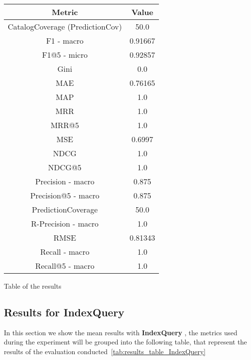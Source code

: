 \documentclass[11pt]{article}
\begin{document}
\begin{center}
    \begin{tabular}{|c|c|}
        \hline
        \textbf{Metric} & \textbf{Value} \\ \hline
                CatalogCoverage (PredictionCov) & 50.0 \\ \hline
                F1 - macro & 0.91667 \\ \hline
                F1@5 - micro & 0.92857 \\ \hline
                Gini & 0.0 \\ \hline
                MAE & 0.76165 \\ \hline
                MAP & 1.0 \\ \hline
                MRR & 1.0 \\ \hline
                MRR@5 & 1.0 \\ \hline
                MSE & 0.6997 \\ \hline
                NDCG & 1.0 \\ \hline
                NDCG@5 & 1.0 \\ \hline
                Precision - macro & 0.875 \\ \hline
                Precision@5 - macro & 0.875 \\ \hline
                PredictionCoverage & 50.0 \\ \hline
                R-Precision - macro & 1.0 \\ \hline
                RMSE & 0.81343 \\ \hline
                Recall - macro & 1.0 \\ \hline
                Recall@5 - macro & 1.0 \\ \hline
             \end{tabular}
    \captionsetup{type=table}
    \caption{Table of the results}
    \label{tab:results_table_LinearPredictor}
\end{center}
\hfill\break
\hfill\break




\subsection{Results for IndexQuery}\label{subsec:IndexQuery}
In this section we show the mean results with \textbf{ IndexQuery }, the metrics used during the experiment will be
grouped into the following table, that represent the results of the evaluation conducted~\ref{tab:results_table_IndexQuery}
\end{document}
